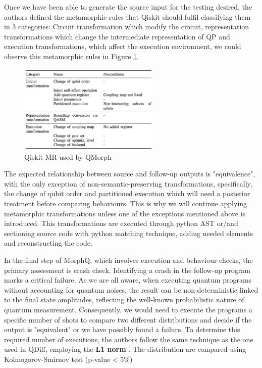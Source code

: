 \begin{itemize}
Once we have been able to generate the source input for the testing desired, the authors defined the metamorphic rules that Qiskit should fulfil classifying them in 3 categories: Circuit transformation which modify the circuit, representation transformations which change the intermediate representation of QP and execution transformations, which affect the execution environment, we could observe this metamorphic rules in Figure \ref{Fig:MorphQMR}. 

\begin{figure}[H]
        \centering
        \includegraphics[width=0.6\textwidth]{TFM/photos/MorphQMR.png}
        \caption{Qiskit MR used by QMorph \cite{paltenghi2023morphq}} 
        \label{Fig:MorphQMR}
\end{figure}

The expected relationship between source and follow-up outputs is "equivalence", with the only exception of non-semantic-preserving transformations, specifically, the change of qubit order and partitioned execution which will need a posterior treatment before comparing behaviours. This is why we will continue applying metamorphic transformations unless one of the exceptions mentioned above is introduced. This transformations are executed through python AST or/and sectioning source code with python matching technique, adding needed elements and reconstructing the code.\newline

In the final step of MorphQ, which involves execution and behaviour checks, the primary assessment is crash check. Identifying a crash in the follow-up program marks a critical failure. As we are all aware, when executing quantum programs without accounting for quantum noises, the result can be non-deterministic linked to the final state amplitudes, reflecting the well-known probabilistic nature of quantum measurement. Consequently, we would need to execute the programs a specific number of shots to compare two different distributions and decide if the output is "equivalent" or we have possibly found a failure. To determine this 
required number of executions, the authors follow the same technique as the one used in QDiff, employing the \textbf{L1 norm }\cite{chan2014optimal}. The distribution are compared using Kolmogorov-Smirnov test (p-value < 5\%)\newline
 

\end{itemize}
